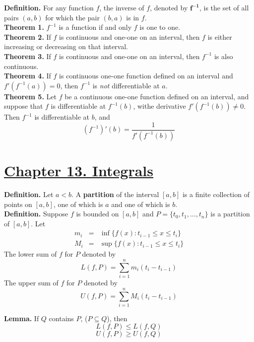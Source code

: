 \documentclass[10pt,letterpaper]{article}
\begin{document}
	\textbf{Definition. } For any function $f$, the inverse of $f$, denoted by $\mathbf{f^{-1}}$, is the 
	set of all pairs $(a, b)$ for which the pair $(b, a)$ is in $f$. \\
	
	\textbf{Theorem 1. } $f^{-1}$ is a function if and only $f$ is one to one.  \\
	
	\textbf{Theorem 2. } If $f$ is continuous and one-one on an interval, then $f$ is either increasing
	or decreasing on that interval.  \\
	
	\textbf{Theorem 3. } If $f$ is continuous and one-one on an interval, then $f^{-1}$ is also continuous. \\
	
	\textbf{Theorem 4. } If $f$ is continuous one-one function defined on an interval and $f'(f^{-1}(a)) = 0$,
	then $f^{-1}$ is \emph{not} differentiable at $a$.  \\
	
	\textbf{Theorem 5. } Let $f$ be a continuous one-one function defined on an interval, and suppose that
	$f$ is differentiable at $f^{-1}(b)$, withe derivative $f'(f^{-1}(b)) \neq 0$. Then $f^{-1}$ is differentiable
	at $b$, and 
	$$(f^{-1})'(b) = \dfrac{1}{f'(f^{-1}(b))}$$
	
	\section*{{\color{red}\underline{Chapter 13. Integrals}}}
	\textbf{Definition. } Let $a < b$. A \textbf{partition} of the interval $[a, b]$ is a finite collection
	of points on $[a, b]$, one of which is $a$ and one of which is $b$. \\
	
	\textbf{Definition. } Suppose $f$ is bounded on $[a, b]$ and $P = \{t_0, t_1, \ldots, t_n\}$ is a partition
	of $[a, b]$. Let
	\begin{eqnarray*}
		m_i &=& \inf\{f(x) : t_{i-1} \leq x \leq t_i\} \\
		M_i &=& \sup\{f(x) : t_{i-1} \leq x \leq t_i\}
	\end{eqnarray*}
	The lower sum of $f$ for $P$ denoted by 
	$$L(f, P) = \displaystyle\sum_{i=1}^{n} m_i(t_i - t_{i-1})$$
	The upper sum of $f$ for $P$ denoted by 
	$$U(f, P) = \displaystyle\sum_{i=1}^{n} M_i(t_i - t_{i-1})$$
	
	\textbf{Lemma. } If $Q$ contains $P$, ($P \subseteq Q$), then 
	$$L(f, P) \leq L(f, Q)$$
	$$U(f, P) \geq U(f, Q)$$
	
\end{document}
